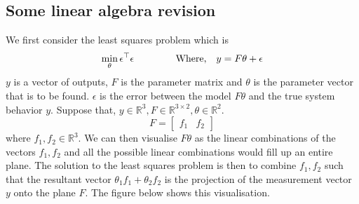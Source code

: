 \subsection{Some linear algebra revision}
We first consider the least squares problem which is 
\begin{equation}
	\min_{\theta} \epsilon^{\top}\epsilon \hspace{15mm} \text{Where,} \quad y = F\theta + \epsilon
	\label{least squares problem}
\end{equation}
$y$ is a vector of outputs, $F$ is the parameter matrix and $\theta$ is the parameter vector that is to be found. $\epsilon$ is the error between the model $F\theta$ and the true system behavior $y$. Suppose that, $y \in \mathbb{R}^{3}, F \in \mathbb{R}^{3 \times 2}, \theta \in \mathbb{R}^{2}$. 
\begin{equation}
	F = 
	\begin{bmatrix}
		f_{1} & f_{2}
	\end{bmatrix}
\end{equation}
where $f_{1}, f_{2} \in \mathbb{R}^{3}$. We can then visualise $F\theta$ as the linear combinations of the vectors $f_{1}, f_{2}$ and all the possible linear combinations would fill up an entire plane. The solution to the least squares problem is then to combine $f_{1}, f_{2}$ such that the resultant vector $\theta_{1}f_{1} + \theta_{2}f_{2}$ is the projection of the measurement vector $y$ onto the plane $F$. The figure below shows this visualisation. 

